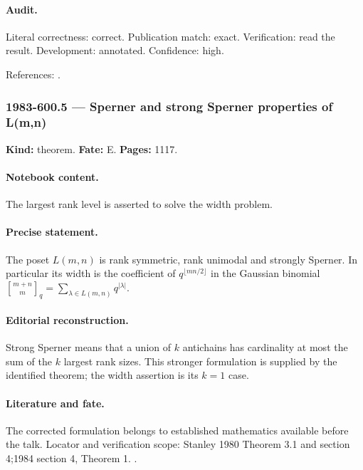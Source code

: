 \paragraph{Audit.} Literal correctness: correct. Publication match: exact. Verification: read the result. Development: annotated. Confidence: high.

\noindent References: \citep{stanley1980weyl}.\par

\subsubsection{1983-600.5 --- Sperner and strong Sperner properties of L(m,n)}

\label{item:1983-600.5}

\noindent\textbf{Kind:} theorem. \textbf{Fate:} E. \textbf{Pages:} 1117.\par

\paragraph{Notebook content.} The largest rank level is asserted to solve the width problem.

\paragraph{Precise statement.} The poset \(L(m,n)\) is rank symmetric, rank unimodal and strongly Sperner. In particular its width is the coefficient of \(q^{\lfloor mn/2\rfloor}\) in the Gaussian binomial \({m+n\brack m}_q=\sum_{\lambda\in L(m,n)}q^{|\lambda|}\).

\paragraph{Editorial reconstruction.} Strong Sperner means that a union of \(k\) antichains has cardinality at most the sum of the \(k\) largest rank sizes. This stronger formulation is supplied by the identified theorem; the width assertion is its \(k=1\) case.

\paragraph{Literature and fate.} The corrected formulation belongs to established mathematics available before the talk. Locator and verification scope: Stanley 1980 Theorem 3.1 and section 4;1984 section 4, Theorem 1. \cite{stanley1980weyl,stanley1984lefschetz}.

